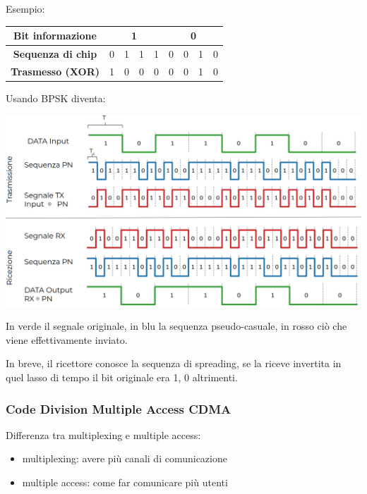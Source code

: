 Esempio:
\begin{center}
	\begin{tabular}{|c|c|c|c|c|c|c|c|c|}
		\hline
		\multicolumn{1}{|c|}{\textbf{Bit informazione}} & \multicolumn{4}{c|}{\textbf{1}} & \multicolumn{4}{c|}{\textbf{0}} \\ 
		\hline
		\textbf{Sequenza di chip} & 0 & 1 & 1 & 1 & 0 & 0 & 1 & 0 \\ 
		\hline
		\textbf{Trasmesso (XOR)} & 1 & 0 & 0 & 0 & 0 & 0 & 1 & 0\\ 
		\hline
	\end{tabular}
\end{center}

Usando BPSK diventa: 
\begin{center}
	\includegraphics[width=0.95\linewidth]{img/wireless/DSSS1}
\end{center}

In verde il {\color{green} segnale originale}, in blu la {\color{blue} sequenza pseudo-casuale}, in rosso ciò che viene {\color{red} effettivamente inviato}.

In breve, il ricettore conosce la sequenza di spreading, se la riceve invertita in quel lasso di tempo il bit originale era 1, 0 altrimenti.



\subsubsection{Code Division Multiple Access CDMA}

Differenza tra multiplexing e multiple access:
\begin{itemize}
	\item multiplexing: avere più canali di comunicazione
	
    \item multiple access: come far comunicare più utenti 
\end{itemize}

